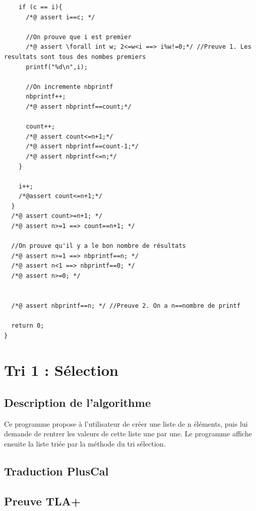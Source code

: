\documentclass{scrreprt}
\begin{document}
\begin{lstlisting}
    if (c == i){
      /*@ assert i==c; */
      
      //On prouve que i est premier
      /*@ assert \forall int w; 2<=w<i ==> i%w!=0;*/ //Preuve 1. Les resultats sont tous des nombes premiers
      printf("%d\n",i);
      
	  //On incremente nbprintf
	  nbprintf++;
      /*@ assert nbprintf==count;*/
      
      count++;
      /*@ assert count<=n+1;*/
      /*@ assert nbprintf==count-1;*/
      /*@ assert nbprintf<=n;*/
    }
    
    i++;
    /*@assert count<=n+1;*/
  }
  /*@ assert count>=n+1; */
  /*@ assert n>=1 ==> count==n+1; */

  //On prouve qu'il y a le bon nombre de résultats
  /*@ assert n>=1 ==> nbprintf==n; */
  /*@ assert n<1 ==> nbprintf==0; */
  /*@ assert n>=0; */

  
  /*@ assert nbprintf==n; */ //Preuve 2. On a n==nombre de printf
  
  return 0;
}
\end{lstlisting}


%
%
%

\chapter{Tri 1 : Sélection}

\section{Description de l'algorithme}
Ce programme propose à l'utilisateur de créer une liste de n éléments, puis lui demande de rentrer les valeurs de cette liste une par une. Le programme affiche ensuite la liste triée par la méthode du tri sélection.

\section{Traduction PlusCal}

\section{Preuve TLA+}
\end{document}
